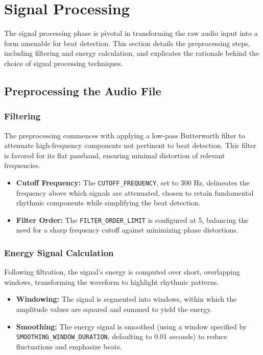 \section{Signal Processing}

The signal processing phase is pivotal in transforming the raw audio input into a form amenable for beat detection. This section details the preprocessing steps, including filtering and energy calculation, and explicates the rationale behind the choice of signal processing techniques.

\subsection{Preprocessing the Audio File}

\subsubsection{Filtering}

The preprocessing commences with applying a low-pass Butterworth filter to attenuate high-frequency components not pertinent to beat detection. This filter is favored for its flat passband, ensuring minimal distortion of relevant frequencies.

\begin{itemize}
    \item \textbf{Cutoff Frequency:} The \texttt{CUTOFF\_FREQUENCY}, set to 300 Hz, delineates the frequency above which signals are attenuated, chosen to retain fundamental rhythmic components while simplifying the beat detection.
    \item \textbf{Filter Order:} The \texttt{FILTER\_ORDER\_LIMIT} is configured at 5, balancing the need for a sharp frequency cutoff against minimizing phase distortions.
\end{itemize}

\subsubsection{Energy Signal Calculation}

Following filtration, the signal's energy is computed over short, overlapping windows, transforming the waveform to highlight rhythmic patterns.

\begin{itemize}
    \item \textbf{Windowing:} The signal is segmented into windows, within which the amplitude values are squared and summed to yield the energy.
    \item \textbf{Smoothing:} The energy signal is smoothed (using a window specified by \texttt{SMOOTHING\_WINDOW\_DURATION}, defaulting to 0.01 seconds) to reduce fluctuations and emphasize beats.
\end{itemize}

